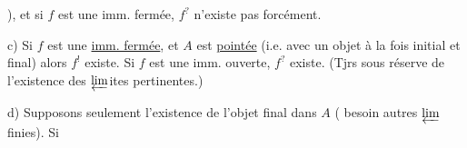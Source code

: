 ), et si $f$ est une imm. fermée, $f^{?}$ n'existe pas forcément.

c) Si $f$ est une \uline{imm. fermée}, et $A$ est \uline{pointée} (i.e. avec un objet à la fois initial et final) alors $f^{!}$ existe. Si $f$ est une imm. ouverte, $f^{?}$ existe. (Tjrs sous réserve de l'existence  des $\varprojlim$ites pertinentes.) 

d) Supposons seulement l'existence de l'objet final\unsure{\textsuperscript{*}} dans $A$ (  besoin autres $\varprojlim$ finies). Si 

